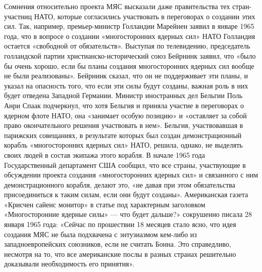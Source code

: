 \documentclass[12pt, a4paper, openany]{book}
\begin{document}
		Сомнения относительно проекта МЯС высказали даже правительства тех стран-участниц НАТО, которые согласились участвовать в переговорах о создании этих сил. Так, например, премьер-министр Голландии Марейнен заявил в январе 1965 года, что в вопросе о создании «многосторонних ядерных сил» НАТО Голландия остается «свободной от обязательств». Выступая по телевидению, председатель голландской партии христианско-исторический союз Бейрнинк заявил, что «было бы очень хорошо, если бы планы создания многосторонних ядерных сил вообще не были реализованы». Бейрнинк сказал, что он не поддерживает эти планы, и указал на опасность того, что если эти силы будут созданы, важная роль в них будет отведена Западной Германии. Министр иностранных дел Бельгии Поль Анри Спаак подчеркнул, что хотя Бельгия и приняла участие в переговорах о ядерном флоте НАТО, она «занимает особую позицию» и «оставляет за собой право окончательного решения участвовать в нем». Бельгия, участвовавшая в парижских совещаниях, в результате которых был создан демонстрационный корабль «многосторонних ядерных сил» НАТО, решила, однако, не выделять своих людей в состав экипажа этого корабля. В начале 1965 года Государственный департамент США сообщил, что все страны, участвующие в обсуждении проекта создания «многосторонних ядерных сил» и связанного с ним демонстрационного корабля, делают это, «не давая при этом обязательства присоединиться к таким силам, если они будут созданы». Американская газета «Крисчен сайенс монитор» в статье под характерным заголовком «Многосторонние ядерные силы» — что будет дальше?» сокрушенно писала 28 января 1965 года: «Сейчас по прошествии 18 месяцев стало ясно, что идея создания МЯС не была подхвачена с энтузиазмом кем-либо из западноевропейских союзников, если не считать Бонна. Это справедливо, несмотря на то, что все американские послы в разных странах решительно доказывали необходимость его принятия».
		
\end{document}
